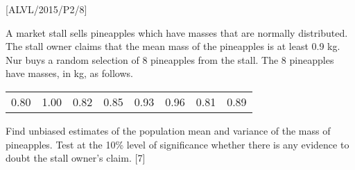 \item {[}ALVL/2015/P2/8{]}

A market stall sells pineapples which have masses that are normally
distributed. The stall owner claims that the mean mass of the pineapples
is at least 0.9 kg. Nur buys a random selection of 8 pineapples from
the stall. The 8 pineapples have masses, in kg, as follows. 
\noindent \begin{center}
\begin{tabular}{cccccccc}
0.80 & 1.00 & 0.82  & 0.85 & 0.93 & 0.96 & 0.81 & 0.89 \tabularnewline
\end{tabular}
\par\end{center}

Find unbiased estimates of the population mean and variance of the
mass of pineapples. Test at the 10\% level of significance whether
there is any evidence to doubt the stall owner\textquoteright s claim.
\hfill{} {[}7{]}
